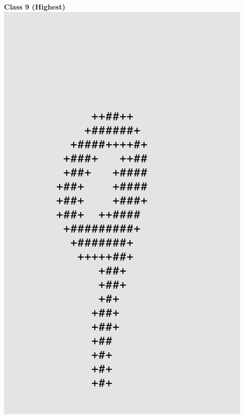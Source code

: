\documentclass[11pt]{article}
\begin{document}
\begin{center}
\begin{multicols}{2}
\textbf{Class 9 (Highest)}\\
\includegraphics[scale=0.4]{part1/1/high_9.png}


\end{multicols}
\end{center}
\end{document}
